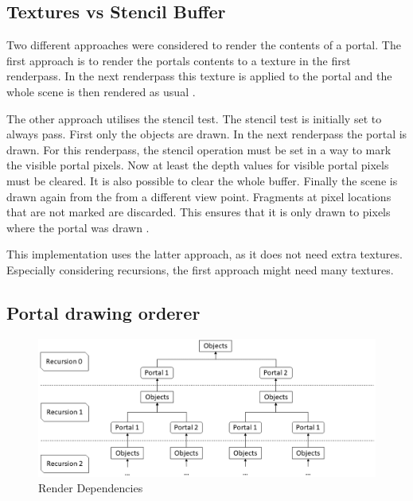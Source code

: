 \subsection{Textures vs Stencil Buffer}
\label{section:textursVsStencil}
Two different approaches were considered to render the contents of a portal. The first approach is to render the portals contents to a texture in the first renderpass. In the next renderpass this texture is applied to the portal and the whole scene is then rendered as usual \cite{schmalstieg:1999:sewing, lecture:portalProblems}.

The other approach utilises the stencil test. The stencil test is initially set to always pass. First only the objects are drawn. In the next renderpass the portal is drawn. For this renderpass, the stencil operation must be set in a way to mark the visible portal pixels. Now at least the depth values for visible portal pixels must be cleared. It is also possible to clear the whole buffer. Finally the scene is drawn again from the from a different view point. Fragments at pixel locations that are not marked are discarded. This ensures that it is only drawn to pixels where the portal was drawn \cites{schmalstieg:1999:sewing, lowe:2005:technique, lecture:portalProblems}.


This implementation uses the latter approach, as it does not need extra textures. Especially considering recursions, the first approach might need many textures. 

\subsection{Portal drawing orderer}

\begin{figure}[h]
	\includegraphics[width=\linewidth]{images/rendertree.png}
	\caption{Render Dependencies}
	\label{fig:rendertree}
\end{figure}


